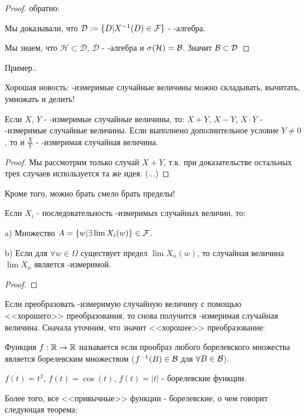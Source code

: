 {\begin{proof}
обратно: 

Мы доказывали, что $\mathcal{D}:=\{D|X^{-1}(D)\in\mathcal{F}\}$ - \s-алгебра.

Мы знаем, что $\mathcal{H}\subset\mathcal{D}$, $\mathcal{D}$ - \s-алгебра и $\sigma(\mathcal{H})=\mathcal{B}$. Значит $\mathcal{B}\subset\mathcal{D}$
\end{proof}


Пример..


Хорошая новость: \F-измеримые случайные величины можно складывать, вычитать, умножать и делить!

\begin{myth} Если $X$, $Y$ - \F-измеримые случайные величины, то: $X+Y$, $X-Y$, $X\cdot Y$ - \F-измеримые случайные величины. Если выполнено дополнительное условие $Y\neq 0$, то и $\frac{X}{Y}$ - \F-измеримая случайная величина.
\end{myth}
\begin{proof} Мы рассмотрим только случай $X+Y$, т.к. при доказательстве остальных трех случаев используется та же идея.
(...)
\end{proof}


Кроме того, можно брать смело брать пределы!

\begin{myth} Если $X_{i}$ - последовательность \F-измеримых случайных величин, то:

a) Множество $A=\{w|\exists \lim X_{i}(w)\}\in\mathcal{F}$.

b) Если для $\forall w\in\Omega$ существует предел $\lim X_{n}(w)$, то случайная величина $\lim X_{n}$ является \F-измеримой.
\end{myth}
\begin{proof}
\end{proof}

Если преобразовать \F-измеримую случайную величину с помощью <<хорошего>> преобразования, то снова получится \F-измеримая случайная величина.
Сначала уточним, что значит <<хорошее>> преобразование:

\begin{mydef} Функция $f:\mathbb{R}\to\mathbb{R}$ называется  если прообраз любого борелевского множества является борелевским множеством ($f^{-1}(B)\in\mathcal{B}$ для $\forall B\in \mathcal{B}$).
\end{mydef}
\begin{myex} $f(t)=t^{2}$, $f(t)=\cos(t)$, $f(t)=|t|$ - борелевские функции.
\end{myex}

Более того, все <<привычные>> функции - борелевские, о чем говорит следующая теорема:

}
